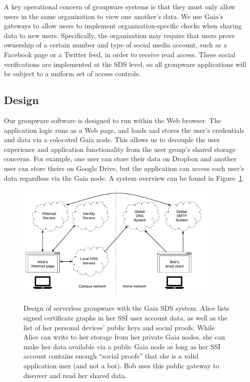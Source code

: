 A key operational concern of groupware systems is that they must only allow
users in the same organization to view one another's data.  We use Gaia's
gateways to allow users to implement organization-specific checks when sharing
data to new users.  Specifically, the organization may require that users prove
ownership of a certain number and type of social media account, such as a
Facebook page or a Twitter feed, in order to receive read access.  These
social verifications are implemented at the SDS level, so all groupware
applications will be subject to a uniform set of access controls.

\subsection{Design}

Our groupware software is designed to run within the Web browser.  The
application logic runs as a Web page, and loads and stores the user's
credentials and data via a colocated Gaia node.  This allows us to decouple the
user experience and application functionality from the user group's shared
storage concerns.  For example, one user can store their data on Dropbox and
another user can store theirs on Google Drive, but the application can access
each user's data regardless via the Gaia node.  A system overview can be found
in Figure~\ref{fig:chap4-gaia-groupware}.

\begin{figure}[h]
   \caption{Design of serverless groupware with the Gaia SDS system.  Alice
   lists signed certificate graphs in her SSI user account data, as well as the
   list of her personal devices' public keys and social proofs.  While Alice can
   write to her storage from her private Gaia nodes, she can make her data
   available via a public Gaia node as long as her SSI account contains enough
   ``social proofs'' that she is a valid application user (and not a bot).  Bob
   uses this public gateway to discover and read her shared data.}
   \centering
   \includegraphics[width=0.9\textwidth,page=23]{figures/dissertation-figures}
   \label{fig:chap4-gaia-groupware}
\end{figure}

